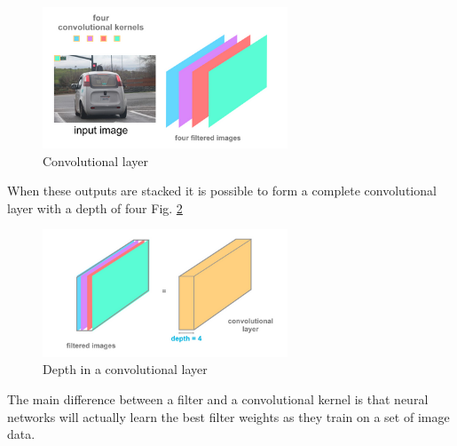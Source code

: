 \documentclass{article}
\begin{document}
\begin{figure}[ht]
    \centering
    \includegraphics[width=0.65\textwidth,height=0.65\textheight,keepaspectratio]{images/conv_layer.png}
    \captionsetup{justification=centering}
    \caption{Convolutional layer}
    \label{fig:f16}
\end{figure}

When these outputs are stacked it is possible to form a complete convolutional layer with a depth of four Fig. \ref{fig:f17}

\begin{figure}[ht]
    \centering
    \includegraphics[width=0.65\textwidth,height=0.65\textheight,keepaspectratio]{images/depth.png}
    \captionsetup{justification=centering}
    \caption{Depth in a convolutional layer}
    \label{fig:f17}
\end{figure}

The main difference between a filter and a convolutional kernel is that neural networks will actually learn the best filter weights as they train on a set of image data. 


\printbibliography
\end{document}
